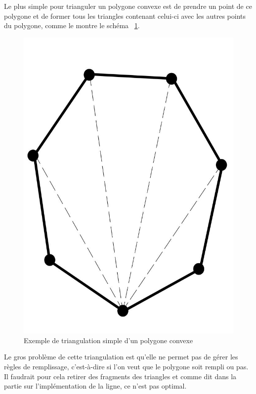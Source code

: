 \documentclass[12pt]{article}
\begin{document}
Le plus simple pour trianguler un polygone convexe est de prendre un point de ce polygone et de former
tous les triangles contenant celui-ci avec les autres points du polygone, comme le montre le schéma ~\ref{fig:triang_poly_conv}.

\begin{figure}[htp]
  \centering
  \includegraphics[scale=0.2]{images/simple_triangulation_polygon}
  \caption{Exemple de triangulation simple d'un polygone convexe}
  \label{fig:triang_poly_conv}
\end{figure}

Le gros problème de cette triangulation est qu'elle ne permet pas de gérer les règles de remplissage,
c'est-à-dire si l'on veut que le polygone soit rempli ou pas. Il faudrait pour cela retirer des fragments
des triangles et comme dit dans la partie sur l'implémentation de la ligne, ce n'est pas optimal.
\end{document}
